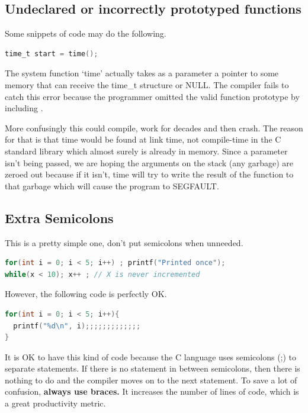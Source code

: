 \subsection{Undeclared or incorrectly prototyped functions}

Some snippets of code may do the following.

\begin{lstlisting}[language=C]
time_t start = time();
\end{lstlisting}

The system function `time' actually takes as a parameter a pointer to some memory that can receive the time\_t structure or NULL.
The compiler fails to catch this error because the programmer omitted the valid function prototype by including .

More confusingly this could compile, work for decades and then crash.
The reason for that is that time would be found at link time, not compile-time in the C standard library which almost surely is already in memory.
Since a parameter isn't being passed, we are hoping the arguments on the stack (any garbage) are zeroed out because if it isn't, time will try to write the result of the function to that garbage which will cause the program to SEGFAULT.

\subsection{Extra Semicolons}

This is a pretty simple one, don't put semicolons when unneeded.

\begin{lstlisting}[language=C]
for(int i = 0; i < 5; i++) ; printf("Printed once");
while(x < 10); x++ ; // X is never incremented
\end{lstlisting}

However, the following code is perfectly OK.

\begin{lstlisting}[language=C]
for(int i = 0; i < 5; i++){
  printf("%d\n", i);;;;;;;;;;;;;
}
\end{lstlisting}

It is OK to have this kind of code because the C language uses semicolons (;) to separate statements.
If there is no statement in between semicolons, then there is nothing to do and the compiler moves on to the next statement.
To save a lot of confusion, \textbf{always use braces.}
It increases the number of lines of code, which is a great productivity metric.


